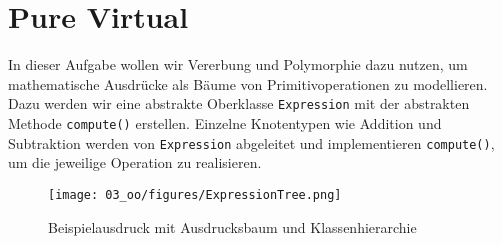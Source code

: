 \section{Pure Virtual}
In dieser Aufgabe wollen wir Vererbung und Polymorphie dazu nutzen, um mathematische Ausdrücke als Bäume von Primitivoperationen zu modellieren.
Dazu werden wir eine abstrakte Oberklasse \lstinline{Expression} mit der abstrakten Methode \lstinline{compute()} erstellen.
Einzelne Knotentypen wie Addition und Subtraktion werden von \lstinline{Expression} abgeleitet und implementieren \lstinline{compute()}, um die jeweilige Operation zu realisieren.
\begin{figure}[h]
\begin{center}
	\texttt{[image: 03\_oo/figures/ExpressionTree.png]}\\
	\caption{Beispielausdruck mit Ausdrucksbaum und Klassenhierarchie}
\end{center}
\end{figure}


